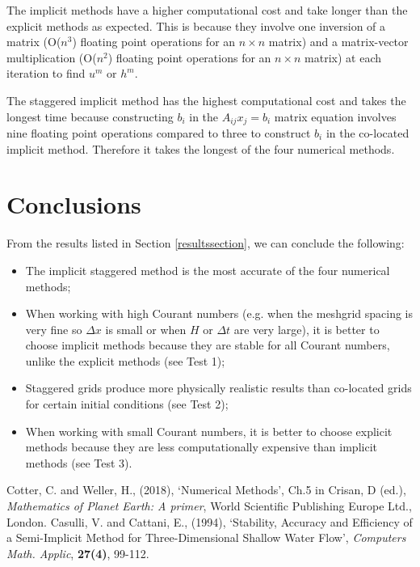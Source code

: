 \documentclass[a4paper, 10.8pt, notitlepage]{article}
\begin{document}
The implicit methods have a higher computational cost and take longer than the explicit methods as expected. This is because they involve one inversion of a matrix (O($n^{3}$) floating point operations for an $n \times n$ matrix) and a matrix-vector multiplication (O($n^{2}$) floating point operations for an $n \times n$ matrix) at each iteration to find $u^{m}$ or $h^{m}$.

The staggered implicit method has the highest computational cost and takes the longest time because constructing $b_{i}$ in the $A_{ij}x_{j} = b_{i}$ matrix equation involves nine floating point operations compared to three to construct $b_{i}$ in the co-located implicit method. Therefore it takes the longest of the four numerical methods.  

\section{Conclusions}

From the results listed in Section \ref{resultssection}, we can conclude the following:

\begin{itemize}
	\item The implicit staggered method is the most accurate of the four numerical methods;
	\item When working with high Courant numbers (e.g. when the meshgrid spacing is very fine so $\Delta x$ is small or when $H$ or $\Delta t$ are very large), it is better to choose implicit methods because they are stable for all Courant numbers, unlike the explicit methods (see Test 1);
	\item Staggered grids produce more physically realistic results than co-located grids for certain initial conditions (see Test 2);
	\item When working with small Courant numbers, it is better to choose explicit methods because they are less computationally expensive than implicit methods (see Test 3).
\end{itemize}


\begin{thebibliography}{9}
	Cotter, C. and Weller, H., (2018), \textquoteleft Numerical Methods\textquoteright, Ch.5 in Crisan, D (ed.), \textit{Mathematics of Planet Earth: A primer}, World Scientific Publishing Europe Ltd., London.
	Casulli, V. and Cattani, E., (1994), \textquoteleft Stability, Accuracy and Efficiency of a Semi-Implicit Method for Three-Dimensional Shallow Water Flow\textquoteright, \textit{Computers Math. Applic}, \textbf{27(4)}, 99-112.
\end{thebibliography}
\end{document}
